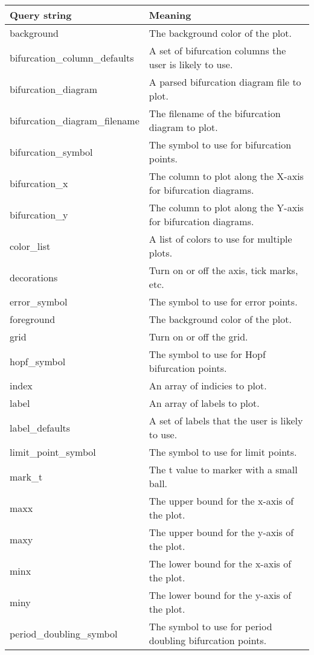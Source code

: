 \begin{longtable}{| l | l |}
\hline
Query string & Meaning \\
\hline
background  &  The background color of the plot. \\
\hline
bifurcation\_column\_defaults  & A set of bifurcation columns the user is likely to use. \\
\hline
bifurcation\_diagram  &  A parsed bifurcation diagram file to plot. \\
\hline
bifurcation\_diagram\_filename  & The filename of the bifurcation diagram to plot. \\
\hline
bifurcation\_symbol  &  The symbol to use for bifurcation points. \\ 
\hline
bifurcation\_x  & The column to plot along the X-axis for bifurcation diagrams. \\
\hline
bifurcation\_y  & The column to plot along the Y-axis for bifurcation diagrams. \\
\hline
color\_list  &  A list of colors to use for multiple plots. \\
\hline
decorations  & Turn on or off the axis, tick marks, etc. \\
\hline
error\_symbol  &    The symbol to use for error points. \\ 
\hline
foreground  &  The background color of the plot. \\
\hline
grid  &  Turn on or off the grid. \\
\hline
hopf\_symbol  &    The symbol to use for Hopf bifurcation points. \\ 
\hline
index  & An array of indicies to plot.\\
\hline
label  & An array of labels to plot.\\
\hline
label\_defaults  & A set of labels that the user is likely to use. \\
\hline
limit\_point\_symbol  &    The symbol to use for limit points. \\ 
\hline
mark\_t  &  The t value to marker with a small ball. \\      
\hline
maxx  & The upper bound for the x-axis of the plot. \\
\hline
maxy  & The upper bound for the y-axis of the plot. \\
\hline
minx  &  The lower bound for the x-axis of the plot. \\
\hline
miny  & The lower bound for the y-axis of the plot. \\
\hline
period\_doubling\_symbol  &   The symbol to use for period doubling bifurcation points. \\ 

\end{longtable}
